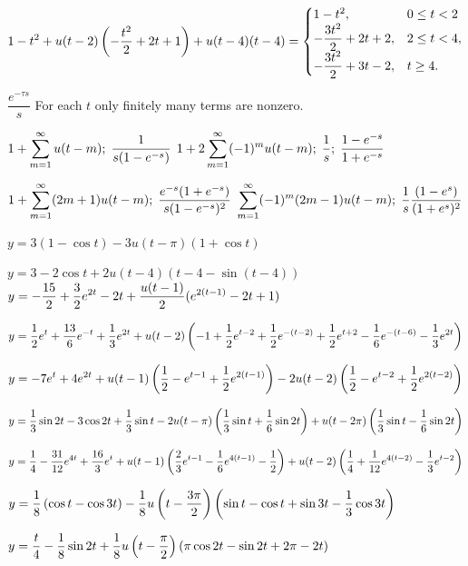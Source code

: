 $\displaystyle{1-t^2+u(t-2)\left(-\frac{t^2}{2}+2t+1\right) +u(t-4)(t-4)}=
\displaystyle{\begin{cases} 1-t^2,&0\le t<2\\
-\dfrac{3t^2}{2} +2t+2,&2\le t<4,\\
-\dfrac{3t^2}{2}+3t-2,&t\ge 4.\end{cases}}$

 $\dfrac{e^{-\tau s}}{s}$
 For each $t$ only finitely many terms are nonzero.

 $\displaystyle{1+\sum_{m=1}^\infty u(t-m);\;
\frac{1}{s(1-e^{-s})}}$
 $\displaystyle{1+2\sum_{m=1}^\infty (-1)^mu(t-m);\;
\frac{1}{s};\; \frac{1-e^{-s}}{1+e^{-s}}}$

 $\displaystyle{1+\sum_{m=1}^\infty(2m+1)u(t-m);\;
\frac{e^{-s}(1+e^{-s})}{s(1-e^{-s})^2}}$
$\displaystyle{\sum_{m=1}^\infty(-1)^m(2m-1)u(t-m);\;   \frac{1}{s}\frac{(1-e^s)}{(1+e^s)^2}}$


  $y=3(1-\cos t)-3u(t-\pi)(1+\cos t)$

 $y=3-2\cos t+2u(t-4)\left(t-4-\sin
(t-4)\right)$
  $y=\displaystyle{-\frac{15}{2}+\frac{3}{2}e^{2t}-2t+\frac{u(t-1)}{2} (e^{2(t-1)}-2t+1)}$

$y=\displaystyle{\frac{1}{2}e^t+\frac{13}{6}e^{-t}+ \frac{1}{3}e^{2t}
+u(t-2)\left(-1+\frac{1}{2}e^{t-2}+\frac{1}{2}e^{-(t-2)}+
\frac{1}{2}e^{t+2}-\frac{1}{6} e^{-(t-6)}-\frac{1}{3}e^{2t}\right)}$

$y=\displaystyle{-7e^t+4e^{2t}+u(t-1)\left(\frac{1}{2}-e^{t-1}+\frac{1}{2}e^{2(t-1)}\right) -2u(t-2)\left(\frac{1}{2}-
e^{t-2}+\frac{1}{2}e^{2(t-2)}\right)}$

  $y=\displaystyle{\frac{1}{3}\sin2t-3\cos2t+\frac{1}{3}\sin t
-2 u(t-\pi)\left(\frac{1}{3}\sin t+\frac{1}{6}\sin2t\right)
+u(t-2\pi)\left(\frac{1}{3}\sin
t-\frac{1}{6}\sin2t\right)}$

  $y=\displaystyle{\frac{1}{4}-\frac{31}{12} e^{4t}+\frac{16}{3} e^t
+u(t-1)\left(\frac{2}{3}e^{t-1}-\frac{1}{6}e^{4(t-1)}-\frac{1}{2}
\right)
+u(t-2)\left(\frac{1}{4}+\frac{1}{12} e^{4(t-2)}-\frac{1}{3} e^{t-2}\right)}$

$y=\displaystyle{\frac{1}{8}\left(\cos t-\cos 3t\right) -
\frac{1}{8} u\left( t-\frac{3\pi}{2}\right)\left(\sin t-\cos t+ \sin
3t-\frac{1}{3}\cos 3t\right)}$

  $y=\displaystyle{ \frac{t}{4}-\frac{1}{8}\sin2t
+\frac{1}{8}u\left(t-\frac{\pi}{2}\right)
(\pi\cos2t-\sin2t+2\pi-2t)}$

